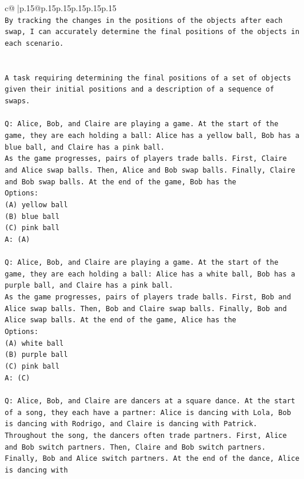 \documentclass{article}
\begin{document}
{\begin{supertabular}{c@{$\;$}|p{.15\linewidth}@{}p{.15\linewidth}p{.15\linewidth}p{.15\linewidth}p{.15\linewidth}p{.15\linewidth}}
{{{\\ 
\texttt{By tracking the changes in the positions of the objects after each swap, I can accurately determine the final positions of the objects in each scenario.} \\
\\ 
\\ 
\texttt{A task requiring determining the final positions of a set of objects given their initial positions and a description of a sequence of swaps.} \\
\\ 
\texttt{Q: Alice, Bob, and Claire are playing a game. At the start of the game, they are each holding a ball: Alice has a yellow ball, Bob has a blue ball, and Claire has a pink ball.} \\
\texttt{As the game progresses, pairs of players trade balls. First, Claire and Alice swap balls. Then, Alice and Bob swap balls. Finally, Claire and Bob swap balls. At the end of the game, Bob has the} \\
\texttt{Options:} \\
\texttt{(A) yellow ball} \\
\texttt{(B) blue ball} \\
\texttt{(C) pink ball} \\
\texttt{A: (A)} \\
\\ 
\texttt{Q: Alice, Bob, and Claire are playing a game. At the start of the game, they are each holding a ball: Alice has a white ball, Bob has a purple ball, and Claire has a pink ball.} \\
\texttt{As the game progresses, pairs of players trade balls. First, Bob and Alice swap balls. Then, Bob and Claire swap balls. Finally, Bob and Alice swap balls. At the end of the game, Alice has the} \\
\texttt{Options:} \\
\texttt{(A) white ball} \\
\texttt{(B) purple ball} \\
\texttt{(C) pink ball} \\
\texttt{A: (C)} \\
\\ 
\texttt{Q: Alice, Bob, and Claire are dancers at a square dance. At the start of a song, they each have a partner: Alice is dancing with Lola, Bob is dancing with Rodrigo, and Claire is dancing with Patrick.} \\
\texttt{Throughout the song, the dancers often trade partners. First, Alice and Bob switch partners. Then, Claire and Bob switch partners. Finally, Bob and Alice switch partners. At the end of the dance, Alice is dancing with} \\
}}}
\end{supertabular}}
\end{document}
